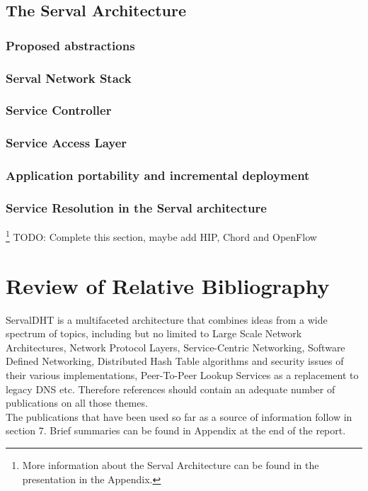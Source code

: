 \documentclass[12pt,a4paper,oneside]{article}
\begin{document}
\subsection{The Serval Architecture}
\subsubsection{Proposed abstractions}
\subsubsection{Serval Network Stack}
\subsubsection*{Service Controller}
\subsubsection*{Service Access Layer}
\subsubsection{Application portability and incremental deployment}
\subsubsection{Service Resolution in the Serval architecture}
\footnote{More information about the Serval Architecture can be found in the presentation in the Appendix.}
TODO: Complete this section, maybe add HIP, Chord and OpenFlow


\newpage
\section{Review of Relative Bibliography}
ServalDHT is a multifaceted architecture that combines ideas from a wide spectrum of topics, including but no limited to Large Scale Network Architectures, Network Protocol Layers, Service-Centric Networking, Software Defined Networking, Distributed Hash Table algorithms and security issues of their various implementations, Peer-To-Peer Lookup Services as a replacement to legacy DNS etc. Therefore references should contain an adequate number of publications on all those themes.\\
\indent The publications that have been used so far as a source of information follow in section 7. Brief summaries can be found in Appendix at the end of the report.
\end{document}
